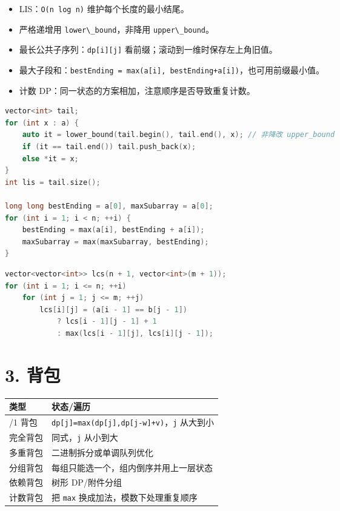 \begin{itemize}
\tightlist
\item
  LIS：\passthrough{\lstinline!O(n log n)!} 维护每个长度的最小结尾。
\item
  严格递增用 \passthrough{\lstinline!lower\_bound!}，非降用 \passthrough{\lstinline!upper\_bound!}。
\item
  最长公共子序列：\passthrough{\lstinline!dp[i][j]!} 看前缀；滚动到一维时保存左上角旧值。
\item
  最大子段和：\passthrough{\lstinline!bestEnding = max(a[i], bestEnding+a[i])!}，也可用前缀最小值。
\item
  计数 DP：同一状态的方案相加，注意顺序是否导致重复计数。
\end{itemize}

\begin{lstlisting}[language={C++}]
vector<int> tail;
for (int x : a) {
    auto it = lower_bound(tail.begin(), tail.end(), x); // 非降改 upper_bound
    if (it == tail.end()) tail.push_back(x);
    else *it = x;
}
int lis = tail.size();

long long bestEnding = a[0], maxSubarray = a[0];
for (int i = 1; i < n; ++i) {
    bestEnding = max(a[i], bestEnding + a[i]);
    maxSubarray = max(maxSubarray, bestEnding);
}
\end{lstlisting}

\begin{lstlisting}[language={C++}]
vector<vector<int>> lcs(n + 1, vector<int>(m + 1));
for (int i = 1; i <= n; ++i)
    for (int j = 1; j <= m; ++j)
        lcs[i][j] = (a[i - 1] == b[j - 1])
            ? lcs[i - 1][j - 1] + 1
            : max(lcs[i - 1][j], lcs[i][j - 1]);
\end{lstlisting}

\section{3. 背包}\label{ux80ccux5305}

\begin{longtable}[]{@{}ll@{}}
\toprule\noalign{}
类型 & 状态/遍历 \\
\midrule\noalign{}
\endhead
\bottomrule\noalign{}
\endlastfoot
0/1 背包 & \passthrough{\lstinline!dp[j]=max(dp[j],dp[j-w]+v)!}，\passthrough{\lstinline!j!} 从大到小 \\
完全背包 & 同式，\passthrough{\lstinline!j!} 从小到大 \\
多重背包 & 二进制拆分或单调队列优化 \\
分组背包 & 每组只能选一个，组内倒序并用上一层状态 \\
依赖背包 & 树形 DP/附件分组 \\
计数背包 & 把 \passthrough{\lstinline!max!} 换成加法，模数下处理重复顺序 \\
\end{longtable}

